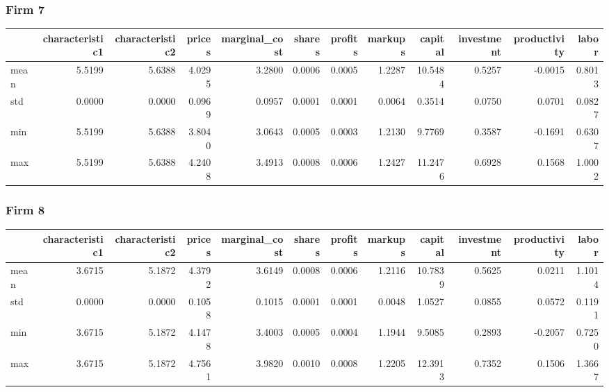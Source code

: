  \subsubsection*{Firm 7}
\begin{tabular}{lrrrrrrrrrrr}
\toprule
{} &  characteristic1 &  characteristic2 &  prices &  marginal\_cost &  shares &  profits &  markups &  capital &  investment &  productivity &  labor \\
\midrule
mean &           5.5199 &           5.6388 &  4.0295 &         3.2800 &  0.0006 &   0.0005 &   1.2287 &  10.5484 &      0.5257 &       -0.0015 & 0.8013 \\
std  &           0.0000 &           0.0000 &  0.0969 &         0.0957 &  0.0001 &   0.0001 &   0.0064 &   0.3514 &      0.0750 &        0.0701 & 0.0827 \\
min  &           5.5199 &           5.6388 &  3.8040 &         3.0643 &  0.0005 &   0.0003 &   1.2130 &   9.7769 &      0.3587 &       -0.1691 & 0.6307 \\
max  &           5.5199 &           5.6388 &  4.2408 &         3.4913 &  0.0008 &   0.0006 &   1.2427 &  11.2476 &      0.6928 &        0.1568 & 1.0002 \\
\bottomrule
\end{tabular}


 \subsubsection*{Firm 8}
\begin{tabular}{lrrrrrrrrrrr}
\toprule
{} &  characteristic1 &  characteristic2 &  prices &  marginal\_cost &  shares &  profits &  markups &  capital &  investment &  productivity &  labor \\
\midrule
mean &           3.6715 &           5.1872 &  4.3792 &         3.6149 &  0.0008 &   0.0006 &   1.2116 &  10.7839 &      0.5625 &        0.0211 & 1.1014 \\
std  &           0.0000 &           0.0000 &  0.1058 &         0.1015 &  0.0001 &   0.0001 &   0.0048 &   1.0527 &      0.0855 &        0.0572 & 0.1191 \\
min  &           3.6715 &           5.1872 &  4.1478 &         3.4003 &  0.0005 &   0.0004 &   1.1944 &   9.5085 &      0.2893 &       -0.2057 & 0.7250 \\
max  &           3.6715 &           5.1872 &  4.7561 &         3.9820 &  0.0010 &   0.0008 &   1.2205 &  12.3913 &      0.7352 &        0.1506 & 1.3667 \\
\bottomrule
\end{tabular}


